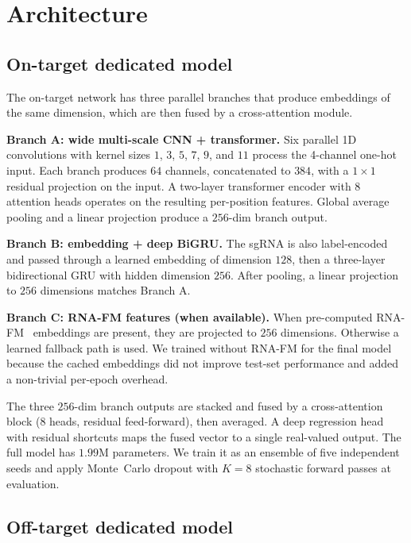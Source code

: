 \documentclass[11pt,a4paper]{article}
\begin{document}
\section{Architecture}
\label{sec:arch}

\subsection{On-target dedicated model}

The on-target network has three parallel branches that produce embeddings of the same dimension, which are then fused by a cross-attention module.

\textbf{Branch A: wide multi-scale CNN + transformer.} Six parallel 1D convolutions with kernel sizes $1$, $3$, $5$, $7$, $9$, and $11$ process the 4-channel one-hot input. Each branch produces $64$ channels, concatenated to $384$, with a $1\!\times\!1$ residual projection on the input. A two-layer transformer encoder with $8$ attention heads operates on the resulting per-position features. Global average pooling and a linear projection produce a $256$-dim branch output.

\textbf{Branch B: embedding + deep BiGRU.} The sgRNA is also label-encoded and passed through a learned embedding of dimension $128$, then a three-layer bidirectional GRU with hidden dimension $256$. After pooling, a linear projection to $256$ dimensions matches Branch A.

\textbf{Branch C: RNA-FM features (when available).} When pre-computed RNA-FM~\citep{rna_fm} embeddings are present, they are projected to $256$ dimensions. Otherwise a learned fallback path is used. We trained without RNA-FM for the final model because the cached embeddings did not improve test-set performance and added a non-trivial per-epoch overhead.

The three $256$-dim branch outputs are stacked and fused by a cross-attention block ($8$ heads, residual feed-forward), then averaged. A deep regression head with residual shortcuts maps the fused vector to a single real-valued output. The full model has $1.99$M parameters. We train it as an ensemble of five independent seeds and apply Monte~Carlo dropout with $K{=}8$ stochastic forward passes at evaluation.

\subsection{Off-target dedicated model}
\end{document}
